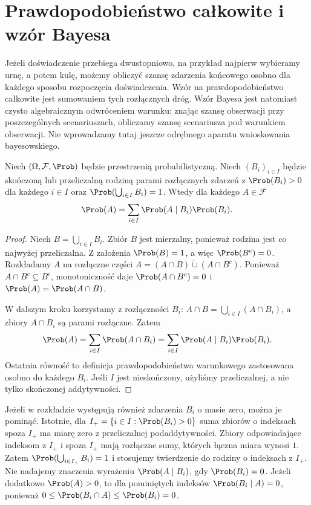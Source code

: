 \section{Prawdopodobieństwo całkowite i wzór Bayesa}
Jeżeli doświadczenie przebiega dwustopniowo, na przykład najpierw
wybieramy urnę, a potem kulę, możemy obliczyć szansę zdarzenia
końcowego osobno dla każdego sposobu rozpoczęcia doświadczenia.
Wzór na prawdopodobieństwo całkowite jest sumowaniem tych
rozłącznych dróg. Wzór Bayesa jest natomiast czysto algebraicznym
odwróceniem warunku: znając szansę obserwacji przy poszczególnych
scenariuszach, obliczamy szansę scenariusza pod warunkiem obserwacji.
Nie wprowadzamy tutaj jeszcze odrębnego aparatu wnioskowania
bayesowskiego.

\begin{twierdzenie}
Niech $(\Omega,\mathcal F,\Prob)$ będzie przestrzenią probabilistyczną.
Niech $(B_i)_{i\in I}$ będzie skończoną lub przeliczalną rodziną
parami rozłącznych zdarzeń z $\Prob(B_i)>0$ dla każdego $i\in I$
oraz $\Prob(\bigcup_{i\in I}B_i)=1$.
Wtedy dla każdego $A\in\mathcal F$
\begin{equation}\label{eq:totalprob}
\Prob(A)=\sum_{i\in I}\Prob(A\mid B_i)\Prob(B_i).
\end{equation}
\end{twierdzenie}
\begin{proof}
Niech $B=\bigcup_{i\in I}B_i$. Zbiór $B$ jest mierzalny,
ponieważ rodzina jest co najwyżej przeliczalna.
Z założenia $\Prob(B)=1$, a więc $\Prob(B^c)=0$.
Rozkładamy $A$ na rozłączne części
$A=(A\cap B)\mathbin{\dot\cup}(A\cap B^c)$.
Ponieważ $A\cap B^c\subseteq B^c$, monotoniczność
daje $\Prob(A\cap B^c)=0$ i
$\Prob(A)=\Prob(A\cap B)$.

W dalszym kroku korzystamy z rozłączności $B_i$:
$A\cap B=\bigcup_{i\in I}(A\cap B_i)$,
a zbiory $A\cap B_i$ są parami rozłączne. Zatem
\[
\Prob(A)=\sum_{i\in I}\Prob(A\cap B_i)
=\sum_{i\in I}\Prob(A\mid B_i)\Prob(B_i).
\]
Ostatnia równość to definicja prawdopodobieństwa
warunkowego zastosowana osobno do każdego $B_i$.
Jeśli $I$ jest nieskończony, użyliśmy przeliczalnej,
a nie tylko skończonej addytywności.
\end{proof}

\begin{uwaga}
Jeżeli w rozkładzie występują również zdarzenia $B_i$ o masie zero,
można je pominąć. Istotnie, dla $I_+=\{i\in I:\Prob(B_i)>0\}$
suma zbiorów o indeksach spoza $I_+$ ma miarę zero
z przeliczalnej podaddytywności. Zbiory odpowiadające indeksom z $I_+$ i spoza $I_+$ mają
rozłączne sumy, których łączna miara wynosi $1$. Zatem
$\Prob(\bigcup_{i\in I_+}B_i)=1$ i stosujemy twierdzenie
do rodziny o indeksach z $I_+$. Nie nadajemy znaczenia
wyrażeniu $\Prob(A\mid B_i)$, gdy $\Prob(B_i)=0$.
Jeżeli dodatkowo $\Prob(A)>0$, to dla pominiętych indeksów
$\Prob(B_i\mid A)=0$, ponieważ
$0\leq\Prob(B_i\cap A)\leq\Prob(B_i)=0$.
\end{uwaga}

